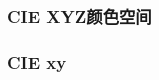 \documentclass{beamer}
\begin{document}
{{\begin{frame}
  \quad{}
\end{frame}}{\begin{frame}
  \frametitle{CIE XYZ颜色空间}
  
  {\hspace{3em}}
\end{frame}}{\begin{frame}
  \frametitle{CIE xy}
  

\end{frame}}}
\end{document}
